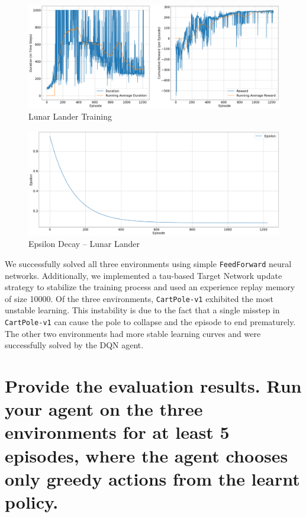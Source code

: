 \documentclass{article} %
\begin{document}
\begin{figure}[H]
    \begin{center}
        \includegraphics[width=\textwidth]{lunar_training_ddqn.png}
    \end{center}
    \caption{Lunar Lander Training}
\end{figure}

\begin{figure}[H]
    \begin{center}
        \includegraphics[width=\textwidth]{eps_lunar_ddqn.png}
    \end{center}
    \caption{Epsilon Decay -- Lunar Lander}
\end{figure}

We successfully solved all three environments using simple \verb|FeedForward| neural networks. Additionally, we implemented a tau-based Target Network update strategy to stabilize the training process and used an experience replay memory of size 10000. Of the three environments, \verb|CartPole-v1| exhibited the most unstable learning. This instability is due to the fact that a single misstep in \verb|CartPole-v1| can cause the pole to collapse and the episode to end prematurely. The other two environments had more stable learning curves and were successfully solved by the DQN agent.

\section{Provide the evaluation results. Run your agent on the three environments for at least 5 episodes, where the agent chooses only greedy actions from the learnt policy.}
\end{document}
